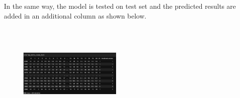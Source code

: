 \documentclass[conference]{IEEEtran}
\begin{document}
\begin{enumerate}
\begin{figure}[!htbp]
    \label{fig:my_label}
\end{figure}
In the same way, the model is tested on test set and the predicted results are added in an additional column as shown below.
\begin{figure}[!htbp]
    \centering
    \includegraphics[width=5cm, height=5cm]{task2.8.png}
    \label{fig:my_label}
\end{figure}
\end{enumerate}
\end{document}
